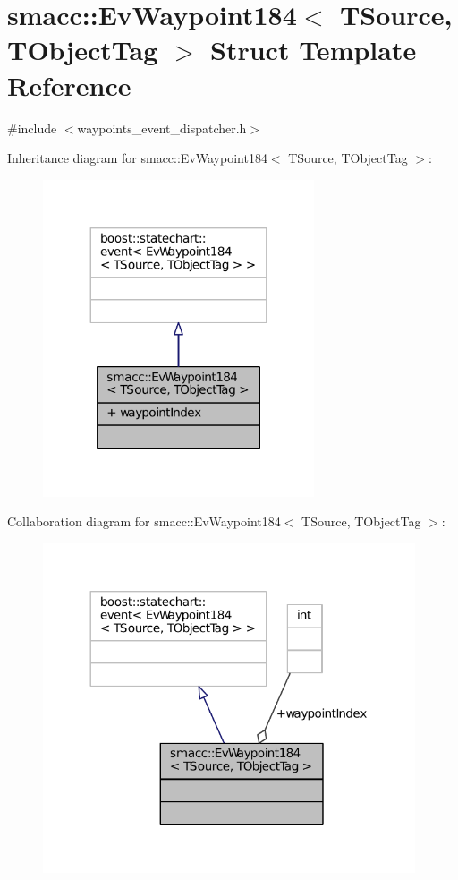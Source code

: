 \hypertarget{structsmacc_1_1EvWaypoint184}{}\section{smacc\+:\+:Ev\+Waypoint184$<$ T\+Source, T\+Object\+Tag $>$ Struct Template Reference}
\label{structsmacc_1_1EvWaypoint184}


{\ttfamily \#include $<$waypoints\+\_\+event\+\_\+dispatcher.\+h$>$}



Inheritance diagram for smacc\+:\+:Ev\+Waypoint184$<$ T\+Source, T\+Object\+Tag $>$\+:
\nopagebreak
\begin{figure}[H]
\begin{center}
\leavevmode
\includegraphics[width=227pt]{structsmacc_1_1EvWaypoint184__inherit__graph}
\end{center}
\end{figure}


Collaboration diagram for smacc\+:\+:Ev\+Waypoint184$<$ T\+Source, T\+Object\+Tag $>$\+:
\nopagebreak
\begin{figure}[H]
\begin{center}
\leavevmode
\includegraphics[width=312pt]{structsmacc_1_1EvWaypoint184__coll__graph}
\end{center}
\end{figure}
